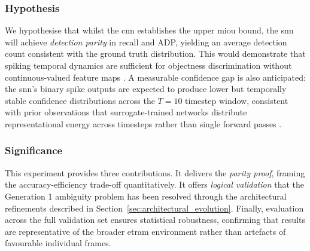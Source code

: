 \subsubsection{Hypothesis}

We hypothesise that whilst the \gls{cnn} establishes the upper \gls{miou} bound, the \gls{snn} will achieve \textit{detection parity} in recall and ADP, 
yielding an average detection count consistent with the ground truth distribution. 
This would demonstrate that spiking temporal dynamics are sufficient for objectness discrimination without
continuous-valued feature maps \parencite{Roy2019SpikeBasedMI,cordone2022objectdetectionspikingneural}. 
A measurable confidence gap is also anticipated: the \gls{snn}'s binary spike outputs are expected to produce lower but temporally
stable confidence distributions across the $T = 10$ timestep window, consistent with
prior observations that surrogate-trained networks distribute representational energy across timesteps rather than single forward passes \parencite{fang2022resnet_sew}.

\subsubsection{Significance}

This experiment provides three contributions. 
It delivers the \textit{parity proof}, framing the accuracy-efficiency trade-off quantitatively. 
It offers \textit{logical validation} that the Generation 1 ambiguity problem has been resolved through the
architectural refinements described in Section~\ref{sec:architectural_evolution}.
Finally, evaluation across the full validation set ensures statistical robustness,
confirming that results are representative of the broader \gls{etram} environment rather than artefacts of favourable individual frames.